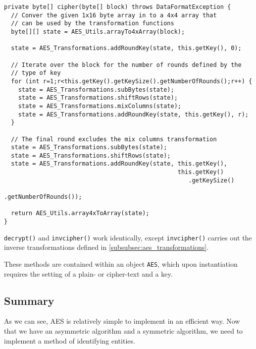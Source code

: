     \begin{lstlisting}
private byte[] cipher(byte[] block) throws DataFormatException {
  // Conver the given 1x16 byte array in to a 4x4 array that
  // can be used by the transformation functions
  byte[][] state = AES_Utils.arrayTo4xArray(block);
  
  state = AES_Transformations.addRoundKey(state, this.getKey(), 0);
  
  // Iterate over the block for the number of rounds defined by the 
  // type of key
  for (int r=1;r<this.getKey().getKeySize().getNumberOfRounds();r++) {
    state = AES_Transformations.subBytes(state);
    state = AES_Transformations.shiftRows(state);
    state = AES_Transformations.mixColumns(state);
    state = AES_Transformations.addRoundKey(state, this.getKey(), r);
  }
  
  // The final round excludes the mix columns transformation
  state = AES_Transformations.subBytes(state);
  state = AES_Transformations.shiftRows(state);
  state = AES_Transformations.addRoundKey(state, this.getKey(),
                                                 this.getKey()
                                                    .getKeySize()
                                                    .getNumberOfRounds());
  
  return AES_Utils.array4xToArray(state);
}
\end{lstlisting}

  \verb!decrypt()! and \verb!invcipher()! work identically, except \verb!invcipher()! carries out the inverse transformations defined in \textsection\ref{subsubsec:aes_transformations}.
  
  These methods are contained within an object \verb!AES!, which upon instantiation requires the setting of a plain- or cipher-text and a key.
  
  \subsection{Summary}
  
  As we can see, AES is relatively simple to implement in an efficient way. Now that we have an asymmetric algorithm and a symmetric algorithm, we need to implement a method of identifying entities.